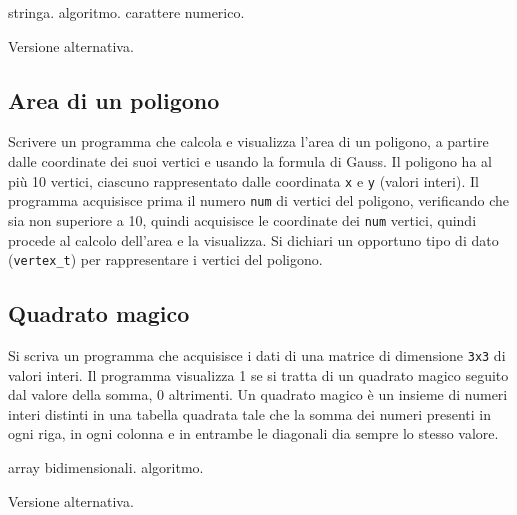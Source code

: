 \begin{tags}
stringa. algoritmo. carattere numerico.
\end{tags}


Versione alternativa.


\subsection{Area di un poligono}
Scrivere un programma che calcola e visualizza l'area di un poligono, a partire dalle coordinate dei suoi vertici e usando la formula di Gauss.
Il poligono ha al pi\`u 10 vertici, ciascuno rappresentato dalle coordinata \texttt{x} e \texttt{y} (valori interi).
Il programma acquisisce prima il numero \texttt{num} di vertici del poligono, verificando che sia non superiore a 10, quindi acquisisce le coordinate dei \texttt{num} vertici, quindi procede al calcolo dell'area e la visualizza.
Si dichiari un opportuno tipo di dato (\texttt{vertex\_t}) per rappresentare i vertici del poligono.



\subsection{Quadrato magico}
Si scriva un programma che acquisisce i dati di una matrice di dimensione \texttt{3x3} di valori interi. Il programma visualizza 1 se si tratta di un quadrato magico seguito dal valore della somma, 0 altrimenti.
Un quadrato magico \`e un insieme di numeri interi distinti in una tabella quadrata tale che la somma dei numeri presenti in ogni riga, in ogni colonna e in entrambe le diagonali dia sempre lo stesso valore.

\begin{tags}
array bidimensionali. algoritmo.
\end{tags}


Versione alternativa.


